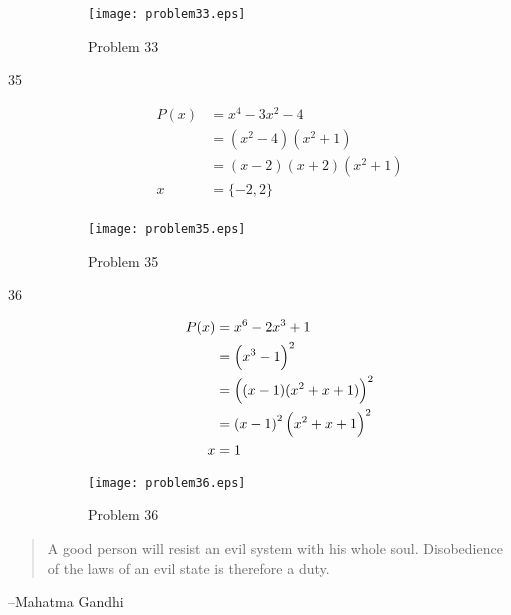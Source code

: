 \documentclass[landscape]{exam}
\begin{document}
\begin{description}
      \begin{figure}[H]
        \centering
        \texttt{[image: problem33.eps]}
        \caption*{Problem 33}
      \end{figure}

    \item[35] 
      \begin{align*}
        P(x) &= x^4 - 3x^2 - 4 \\
             &= (x^2 - 4)(x^2 + 1) \\
             &= (x - 2)(x + 2)(x^2 + 1) \\
        x    &= \{-2, 2 \} \\
      \end{align*}
      
      \begin{figure}[H]
        \centering
        \texttt{[image: problem35.eps]}
        \caption*{Problem 35}
      \end{figure}

    \item[36] 
      \begin{align*}
        P(x) &= x^6 - 2x^3 + 1 \\
             &= \del{x^3 - 1}^2 \\
             &= \del{(x - 1)(x^2 + x + 1)}^2 \\
             &= \del{x - 1}^2 \del{x^2 + x + 1}^2 \\
        x    &= 1 \\
      \end{align*}
      
      \begin{figure}[H]
        \centering
        \texttt{[image: problem36.eps]}
        \caption*{Problem 36}
      \end{figure}

  \end{description}
\else
  \vspace{9 cm}
  \begin{quote}
    \begin{em}
      A good person will resist an evil system with his whole soul. Disobedience of the laws of an evil state is
      therefore a duty.
    \end{em}
  \end{quote}
  \hspace{1 cm} --Mahatma Gandhi

\fi
\end{document}
